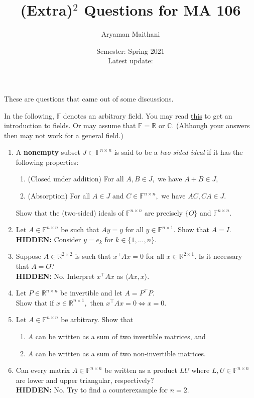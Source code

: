 \documentclass[12pt]{article}
\title{(Extra)\texorpdfstring{$^2$}{2} Questions for MA 106}
\author{Aryaman Maithani}%
\date{Semester: Spring 2021\\ Latest update: \DTMnow}
\newcommand{\hint}[1]{\textbf{HIDDEN:} {\color[rgb]{0.95, 0.95, 0.95}#1}}
\begin{document}
\maketitle

These are questions that came out of some discussions.

In the following, $\mathbb{F}$ denotes an arbitrary field. You may read \href{https://aryamanmaithani.github.io/ma-106-2021-tut/fields-and-vector-spaces.pdf}{this} to get an introduction to fields. Or may assume that $\mathbb{F} = \mathbb{R}$ or $\mathbb{C}.$ (Although your answers then may not work for a general field.)

\begin{enumerate}[leftmargin=*]
	\item A \textbf{nonempty} subset $J \subset \mathbb{F}^{n \times n}$ is said to be a \emph{two-sided ideal} if it has the following properties:
	\begin{enumerate}
		\item (Closed under addition) For all $A, B \in J,$ we have $A + B \in J,$
		\item (Absorption) For all $A \in J$ and $C \in \mathbb{F}^{n \times n},$ we have $AC, CA \in J.$
	\end{enumerate}
	Show that the (two-sided) ideals of $\mathbb{F}^{n \times n}$ are precisely $\{O\}$ and $\mathbb{F}^{n \times n}.$
	\item Let $A \in \mathbb{F}^{n \times n}$ be such that $Ay = y$ for all $y \in \mathbb{F}^{n \times 1}.$ Show that $A = I.$\\
	\hint{Consider $y = e_k$ for $k \in \{1, \ldots, n\}.$}
	\item Suppose $A \in \mathbb{R}^{2 \times 2}$ is such that $x^\top Ax = 0$ for all $x \in \mathbb{R}^{2 \times 1}.$ Is it necessary that $A = O?$\\
	\hint{No. Interpret $x^\top Ax$ as $\langle Ax, x\rangle.$}
	\item Let $P \in \mathbb{R}^{n \times n}$ be invertible and let $A = P^{\top}P.$ \\
	Show that if $x \in \mathbb{R}^{n \times 1},$ then $x^\top Ax = 0 \iff x = 0.$
	\item Let $A \in \mathbb{F}^{n \times n}$ be arbitrary. Show that
	\begin{enumerate}
		\item $A$ can be written as a sum of two invertible matrices, and
		\item $A$ can be written as a sum of two non-invertible matrices.
	\end{enumerate}
	\item Can every matrix $A \in \mathbb{F}^{n \times n}$ be written as a product $LU$ where $L, U \in \mathbb{F}^{n \times n}$ are lower and upper triangular, respectively?\\
	\hint{No. Try to find a counterexample for $n = 2.$}
\end{enumerate}
\end{document}
